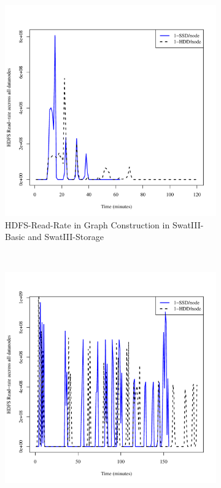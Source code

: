 \documentclass[conference]{IEEEtran}
\begin{document}
\begin{figure}[htb]
        \centering
        \begin{subfigure}[b]{0.3\textwidth}
                \includegraphics[width=\textwidth]{Figure/SystemData/Plots/BGHddSsdHdfsRdIops.pdf}
                \caption{HDFS-Read-Rate in Graph Construction in SwatIII-Basic and SwatIII-Storage}
                \label{fig:BGHddSsdHdfsRdIops}
        \end{subfigure}
        ~ %
        \begin{subfigure}[b]{0.3\textwidth}
                \includegraphics[width=\textwidth]{Figure/SystemData/Plots/ECHddSsdHdfsRdIops.pdf}

\end{subfigure}
\end{figure}
\end{document}
